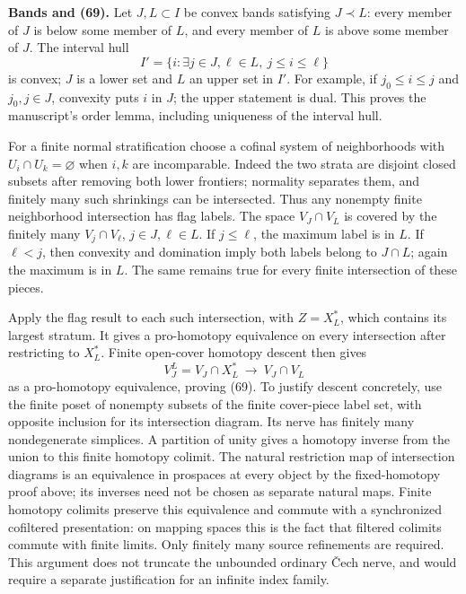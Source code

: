 \textbf{Bands and (69).} Let \(J,L\subset I\) be convex bands satisfying \(J\prec L\): every member of \(J\) is below some member of \(L\), and every member of \(L\) is above some member of \(J\). The interval hull \[
 I'=\{i:\exists j\in J,\ell\in L,\ j\le i\le\ell\}
\] is convex; \(J\) is a lower set and \(L\) an upper set in \(I'\). For example, if \(j_0\le i\le j\) and \(j_0,j\in J\), convexity puts \(i\) in \(J\); the upper statement is dual. This proves the manuscript's order lemma, including uniqueness of the interval hull.

For a finite normal stratification choose a cofinal system of neighborhoods with \(U_i\cap U_k=\varnothing\) when \(i,k\) are incomparable. Indeed the two strata are disjoint closed subsets after removing both lower frontiers; normality separates them, and finitely many such shrinkings can be intersected. Thus any nonempty finite neighborhood intersection has flag labels. The space \(V_J\cap V_L\) is covered by the finitely many \(V_j\cap V_\ell\), \(j\in J,\ell\in L\). If \(j\le\ell\), the maximum label is in \(L\). If \(\ell<j\), then convexity and domination imply both labels belong to \(J\cap L\); again the maximum is in \(L\). The same remains true for every finite intersection of these pieces.

Apply the flag result to each such intersection, with \(Z=X_L^*\), which contains its largest stratum. It gives a pro-homotopy equivalence on every intersection after restricting to \(X_L^*\). Finite open-cover homotopy descent then gives \[
 V_J^L=V_J\cap X_L^*\ \longrightarrow\ V_J\cap V_L
\] as a pro-homotopy equivalence, proving (69). To justify descent concretely, use the finite poset of nonempty subsets of the finite cover-piece label set, with opposite inclusion for its intersection diagram. Its nerve has finitely many nondegenerate simplices. A partition of unity gives a homotopy inverse from the union to this finite homotopy colimit. The natural restriction map of intersection diagrams is an equivalence in prospaces at every object by the fixed-homotopy proof above; its inverses need not be chosen as separate natural maps. Finite homotopy colimits preserve this equivalence and commute with a synchronized cofiltered presentation: on mapping spaces this is the fact that filtered colimits commute with finite limits. Only finitely many source refinements are required. This argument does not truncate the unbounded ordinary \v{C}ech nerve, and would require a separate justification for an infinite index family.

